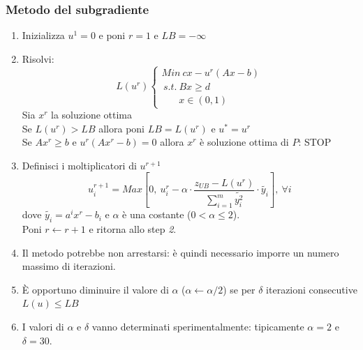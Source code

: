 \subsubsection{Metodo del subgradiente}
\begin{enumerate}
	\item Inizializza $u^{1}=0$ e poni $r=1$ e $LB=-\infty$
	\item Risolvi:
	\begin{equation*}
		L(u^{r})
		\begin{cases}
			Min\ cx-u^{r}(Ax-b)\\
			\,s.t.\ Bx\ge d\\
			\ \ \ \ \ \ \ \ x\in(0,1)
		\end{cases}
	\end{equation*}
	Sia $x^{r}$ la soluzione ottima\\
	Se $L(u^{r})>LB$ allora poni $LB=L(u^{r})$ e $u^{*}=u^{r}$\\
	Se $Ax^{r}\ge b$ e $u^{r}(Ax^{r}-b)=0$ allora $x^{r}$ è soluzione ottima di $P$: STOP
	\item Definisci i moltiplicatori di $u^{r+1}$
	\begin{equation*}
		u_{i}^{r+1}=Max[0,\ u_{i}^{r}-\alpha \cdot\frac{z_{UB}-L(u^{r})}{\sum_{i=1}^{m}\widetilde{y_{i}^{2}}}\cdot\widetilde{y_{i}}],\ \forall i
	\end{equation*}
	dove $\widetilde{y_{i}}=a^{i}x^{r}-b_{i}$ e $\alpha$ è una costante ($0<\alpha\le 2$).\\
	Poni $r\gets r+1$ e ritorna allo step \textit{2}.
	\item Il metodo potrebbe non arrestarsi: è quindi necessario imporre un numero massimo di iterazioni.
	\item È opportuno diminuire il valore di $\alpha$ ($\alpha\gets\alpha/2$) se per $\delta$ iterazioni consecutive $L(u)\le LB$
	\item I valori di $\alpha$ e $\delta$ vanno determinati sperimentalmente: tipicamente $\alpha=2$ e $\delta=30$.
\end{enumerate}

